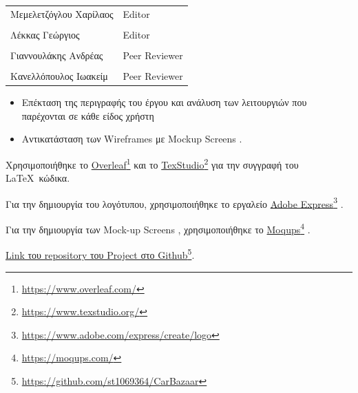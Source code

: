 \documentclass{../ol-softwaremanual}
\newcommand{\doclink}[2]{\href{#1}{#2}\footnote{\url{#1}}}
\begin{document}
	
	\vspace{20pt}
	
	\begin{table}[htbp!]
		\begin{tabular}{ll}
			Μεμελετζόγλου Χαρίλαος & \en Editor \\
			\\ Λέκκας Γεώργιος      &   \en  Editor \\
			\\ Γιαννουλάκης Ανδρέας & \en Peer Reviewer \\
			\\ Κανελλόπουλος Ιωακείμ & \en Peer Reviewer
		\end{tabular}
	\end{table}
	
	\vspace{10pt}
	
	\begin{itemize}
		\item Επέκταση της περιγραφής του έργου και ανάλυση των λειτουργιών που παρέχονται σε κάθε είδος χρήστη
		\item Αντικατάσταση των \en Wireframes \gr με \en Mockup Screens \gr .
	\end{itemize}
	
	
	
	
	\vspace{10pt}
	
	
	\vspace{20pt}
	\flushleft
	
	Χρησιμοποιήθηκε το \en \doclink{https://www.overleaf.com/}{Overleaf} \gr και το \en \doclink{https://www.texstudio.org/}{TexStudio} \gr για την συγγραφή του \LaTeX\ κώδικα. \break
	
	Για την δημιουργία του λογότυπου, χρησιμοποιήθηκε το εργαλείο \en \doclink{https://www.adobe.com/express/create/logo}{Adobe Express} . \gr \break
	
	Για την δημιουργία των \en Mock-up Screens \gr, χρησιμοποιήθηκε το \en \doclink{https://moqups.com/}{Moqups} \gr . \break
	
	\en 	\doclink{https://github.com/st1069364/CarBazaar}{Link \gr του \en  repository \gr του \en Project \gr στο \en Github}. \gr
	
	\newpage
	
\end{document}
